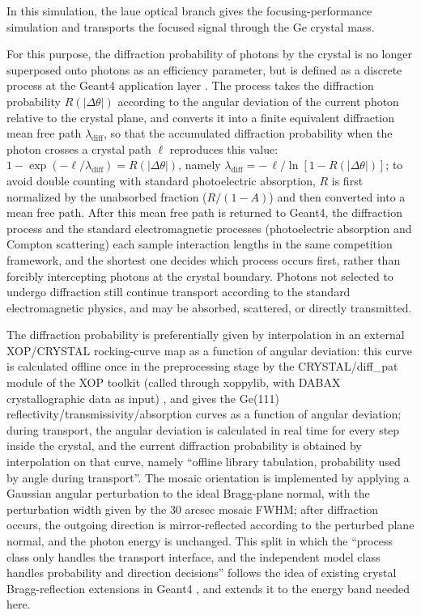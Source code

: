 \documentclass[11pt]{article}
\begin{document}
In this simulation, the laue optical branch gives the focusing-performance simulation and transports the focused signal through the Ge crystal mass.

For this purpose, the diffraction probability of photons by the crystal is no longer superposed onto photons as an efficiency parameter, but is defined as a discrete process at the Geant4 application layer \cite{Agostinelli2003,Allison2016}. The process takes the diffraction probability $R(|\Delta\theta|)$ according to the angular deviation of the current photon relative to the crystal plane, and converts it into a finite equivalent diffraction mean free path $\lambda_{\mathrm{diff}}$, so that the accumulated diffraction probability when the photon crosses a crystal path $\ell$ reproduces this value: $1-\exp(-\ell/\lambda_{\mathrm{diff}})=R(|\Delta\theta|)$, namely $\lambda_{\mathrm{diff}}=-\,\ell/\ln[1-R(|\Delta\theta|)]$; to avoid double counting with standard photoelectric absorption, $R$ is first normalized by the unabsorbed fraction ($R/(1-A)$) and then converted into a mean free path. After this mean free path is returned to Geant4, the diffraction process and the standard electromagnetic processes (photoelectric absorption and Compton scattering) each sample interaction lengths in the same competition framework, and the shortest one decides which process occurs first, rather than forcibly intercepting photons at the crystal boundary. Photons not selected to undergo diffraction still continue transport according to the standard electromagnetic physics, and may be absorbed, scattered, or directly transmitted.

The diffraction probability is preferentially given by interpolation in an external XOP/CRYSTAL rocking-curve map as a function of angular deviation: this curve is calculated offline once in the preprocessing stage by the CRYSTAL/diff\_pat module of the XOP toolkit (called through xoppylib, with DABAX crystallographic data as input) \cite{SanchezDelRio2011XOP}, and gives the Ge(111) reflectivity/transmissivity/absorption curves as a function of angular deviation; during transport, the angular deviation is calculated in real time for every step inside the crystal, and the current diffraction probability is obtained by interpolation on that curve, namely ``offline library tabulation, probability used by angle during transport''. The mosaic orientation is implemented by applying a Gaussian angular perturbation to the ideal Bragg-plane normal, with the perturbation width given by the 30 arcsec mosaic FWHM; after diffraction occurs, the outgoing direction is mirror-reflected according to the perturbed plane normal, and the photon energy is unchanged. This split in which the ``process class only handles the transport interface, and the independent model class handles probability and direction decisions'' follows the idea of existing crystal Bragg-reflection extensions in Geant4 \cite{Guan2023BraggReflection,Reiazi2025G4BraggReflection}, and extends it to the energy band needed here.
\end{document}
